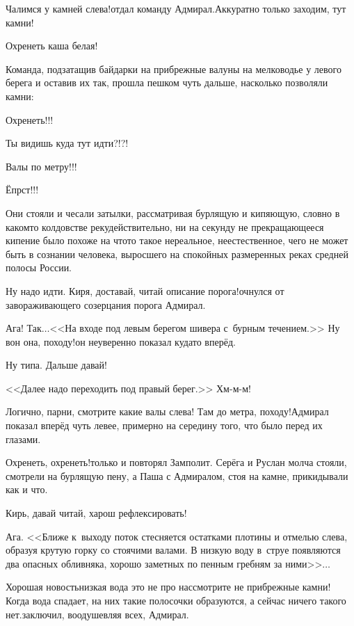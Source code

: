 \diagdash Чалимся у камней слева!\mdash отдал команду Адмирал.\mdash Аккуратно только заходим, тут камни!

\diagdash Охренеть каша белая!

Команда, подзатащив байдарки на прибрежные валуны на мелководье у левого берега и оставив их так, прошла пешком чуть дальше, насколько позволяли камни:

\diagdash Охренеть!!!

\diagdash Ты видишь куда тут идти?!?!

\diagdash Валы по метру!!!

\diagdash Ёпрст!!!

Они стояли и чесали затылки, рассматривая бурлящую и кипяющую, словно в каком\sdash то колдовстве реку\mdash действительно, ни на секунду не прекращающееся кипение было похоже на что\sdash то такое нереальное, неестественное, чего не может быть в сознании человека, выросшего на спокойных размеренных реках средней полосы России.

\diagdash Ну надо идти. Киря, доставай, читай описание порога!\mdash очнулся от завораживающего созерцания порога Адмирал.

\diagdash Ага! Так$\ldots$<<На входе под левым берегом шивера с~бурным течением.>> Ну вон она, походу!\mdash он неуверенно показал куда\sdash то вперёд.

\diagdash Ну типа. Дальше давай!

\diagdash <<Далее надо переходить под правый берег.>> Хм-м-м!

\diagdash Логично, парни, смотрите какие валы слева! Там до метра, походу!\mdash Адмирал показал вперёд чуть левее, примерно на середину того, что было перед их глазами.

\diagdash Охренеть, охренеть!\mdash только и повторял Замполит. Серёга и Руслан молча стояли, смотрели на бурлящую пену, а Паша с Адмиралом, стоя на камне, прикидывали как и что.

\diagdash Кирь, давай читай, харош рефлексировать!

\diagdash Ага. <<Ближе к~выходу поток стесняется остатками плотины и отмелью слева, образуя крутую горку со стоячими валами. В низкую воду в~струе появляются два опасных обливняка, хорошо заметных по пенным гребням за ними>>$\ldots$

\diagdash Хорошая новость\mdash низкая вода это не про нас\mdash смотрите не прибрежные камни! Когда вода спадает, на них такие полосочки образуются, а сейчас ничего такого нет.\mdash заключил, воодушевляя всех, Адмирал.

